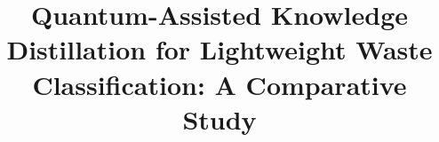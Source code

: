 \documentclass[conference]{IEEEtran}
\title{Quantum-Assisted Knowledge Distillation for Lightweight Waste Classification: A Comparative Study}
\author{\IEEEauthorblockN{Author names}\IEEEauthorblockA{Affiliation}}
\newif\ifextra
\begin{document}
\maketitle

\begin{abstract}

\end{abstract}







\ifextra
  
  
\fi


\FloatBarrier



\ifextra
  
\fi
\end{document}

